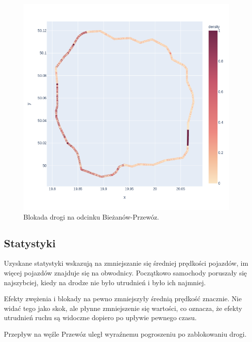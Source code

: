 \documentclass[a4paper,12pt]{article}
\begin{document}
    \begin{figure}[H]
    	\centering
    	\includegraphics[width=\linewidth,height=0.4\textheight]{img/note-sim-blocked.png}
    	\caption{Blokada drogi na odcinku Bieżanów-Przewóz.}
    \end{figure}
    
    \subsection{Statystyki}
    Uzyskane statystyki wskazują na zmniejszanie się średniej prędkości pojazdów, im więcej pojazdów znajduje się na obwodnicy. Początkowo samochody poruszały się najszybciej, kiedy na drodze nie było utrudnień i było ich najmniej.
    
    Efekty zwężenia i blokady na pewno zmniejszyły średnią prędkość znacznie. Nie widać tego jako skok, ale płynne zmniejszenie się wartości, co oznacza, że efekty utrudnień ruchu są widoczne dopiero po upływie pewnego czasu.
    
    Przepływ na węźle Przewóz uległ wyraźnemu pogroszeniu po zablokowaniu drogi.
    
\end{document}
